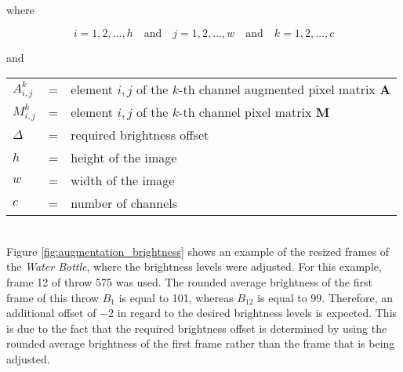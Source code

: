 where

\[
  i = 1, 2, \dots, h \quad \text{and} \quad j = 1, 2, \dots, w \quad \text{and} \quad k = 1, 2, \dots, c
\]

and

\begin{tabular}{lll}
  $A_{i,j}^{k}$ & = & element $i,j$ of the $k$-th channel augmented pixel matrix $\boldsymbol{A}$ \\
  $M_{i,j}^{k}$ & = & element $i,j$ of the $k$-th channel pixel matrix $\boldsymbol{M}$ \\
  $\Delta$ & = & required brightness offset \\
  $h$ & = & height of the image \\
  $w$ & = & width of the image \\
  $c$ & = & number of channels \\
\end{tabular}
\\

Figure \ref{fig:augmentation_brightness} shows an example of the resized frames of the \textit{Water Bottle}, where the brightness levels were adjusted.
For this example, frame \num{12} of throw \num{575} was used.
The rounded average brightness of the first frame of this throw $B_1$ is equal to \num{101}, whereas $B_{12}$ is equal to \num{99}.
Therefore, an additional offset of \num{-2} in regard to the desired brightness levels is expected.
This is due to the fact that the required brightness offset is determined by using the rounded average brightness of the first frame rather than the frame that is being adjusted.

